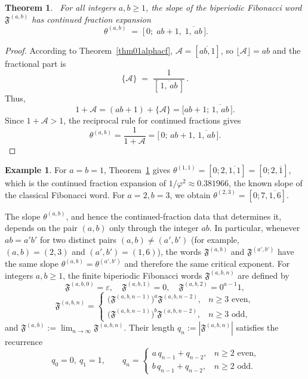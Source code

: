 \documentclass[12pt]{amsart}
\theoremstyle{plain}
\newtheorem{theorem}{Theorem}[section]
\theoremstyle{definition}
\newtheorem{example}{Example}
\theoremstyle{remark}
\newcommand{\AlphA}{\mathcal{A}}
\newcommand{\FD}{\mathfrak{F}}
\begin{document}
\begin{theorem}~\label{thm01slopecf}
For all integers $a,b\geqslant 1$, the slope of the biperiodic Fibonacci
word $\FD^{(a,b)}$ has continued fraction expansion
\begin{equation}~\label{eqq2slopecf}
  \theta^{(a,b)} \;=\; \bigl[\,0;\; ab+1,\; \overline{1,\,ab}\,\bigr].
\end{equation}
\end{theorem}
\begin{proof}
According to Theorem~\ref{thm01alphacf}, $\AlphA =[\overline{ab,1}]$, so 
$\lfloor\AlphA \rfloor=ab$ and the fractional part is
\[
  \{\AlphA \} \;=\; \frac{1}{[\,\overline{1,\,ab}\,]}\,.
\]
Thus,
\[
  1+\AlphA  = (ab+1) + \{\AlphA \} = \bigl[ab+1;\,\overline{1,\,ab}\,\bigr].
\]
Since $1+\AlphA >1$, the reciprocal rule for continued fractions gives
\[
  \theta^{(a,b)} = \frac{1}{1+\AlphA }
  = \bigl[\,0;\, ab+1,\,\overline{1,\,ab}\,\bigr].
\]
\end{proof}

\begin{example}
For $a=b=1$, Theorem~\ref{thm01slopecf} gives
$\theta^{(1,1)} = [0;2,\overline{1,1}] = [0;2,\overline{1}]$, which is
the continued fraction expansion of $1/\varphi^2\approx0.381966$,
the known slope of the classical Fibonacci word. For $a=2,b=3$, we obtain $\theta^{(2,3)}=[0;7,\overline{1,6}]$.
\end{example}

The slope $\theta^{(a,b)}$, and
hence the continued-fraction data that determines it, depends on the
pair $(a,b)$ only through the integer $ab$. In particular, whenever
$ab=a'b'$ for two distinct pairs $(a,b)\neq(a',b')$ (for example, 
$(a,b)=(2,3)$ and $(a',b')=(1,6)$), the words
$\FD^{(a,b)}$ and $\FD^{(a',b')}$ have the same slope
$\theta^{(a,b)}=\theta^{(a',b')}$ and therefore the same critical exponent. 
For integers $a,b\geqslant 1$, the finite biperiodic Fibonacci words
$\FD^{(a,b,n)}$ are defined by
\[
  \FD^{(a,b,0)}=\varepsilon,\quad \FD^{(a,b,1)}=0,\quad \FD^{(a,b,2)}=0^{a-1}1,
\]
\[
  \FD^{(a,b,n)} =
  \begin{cases}
    \bigl(\FD^{(a,b,n-1)}\bigr)^{a} \FD^{(a,b,n-2)}, & n\geqslant 3 \text{ even},\\[2pt]
    \bigl(\FD^{(a,b,n-1)}\bigr)^{b} \FD^{(a,b,n-2)}, & n\geqslant 3 \text{ odd},
  \end{cases}
\]
and $\FD^{(a,b)}:=\lim_{n\to\infty}\FD^{(a,b,n)}$. Their length
$q_n:=|\FD^{(a,b,n)}|$ satisfies the recurrence
\begin{equation}~\label{eqq01qnrecurrence}
  q_0=0,\ q_1=1,\qquad
  q_n = \begin{cases} a\,q_{n-1}+q_{n-2}, & n\geqslant 2\text{ even},\\
                       b\,q_{n-1}+q_{n-2}, & n\geqslant 2\text{ odd}.\end{cases}
\end{equation}
\end{document}
